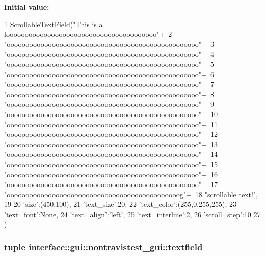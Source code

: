 {\bfseries \-Initial value\-:}
\begin{DoxyCode}
1 ScrollableTextField("This is a loooooooooooooooooooooooooooooooooooooooo\n"+\
2                       "ooooooooooooooooooooooooooooooooooooooooooooooooooo\n"+\
3                       "ooooooooooooooooooooooooooooooooooooooooooooooooooo\n"+\
4                       "ooooooooooooooooooooooooooooooooooooooooooooooooooo\n"+\
5                       "ooooooooooooooooooooooooooooooooooooooooooooooooooo\n"+\
6                       "ooooooooooooooooooooooooooooooooooooooooooooooooooo\n"+\
7                       "ooooooooooooooooooooooooooooooooooooooooooooooooooo\n"+\
8                       "ooooooooooooooooooooooooooooooooooooooooooooooooooo\n"+\
9                       "ooooooooooooooooooooooooooooooooooooooooooooooooooo\n"+\
10                       "ooooooooooooooooooooooooooooooooooooooooooooooooooo\n"+\
11                       "ooooooooooooooooooooooooooooooooooooooooooooooooooo\n"+\
12                       "ooooooooooooooooooooooooooooooooooooooooooooooooooo\n"+\
13                       "ooooooooooooooooooooooooooooooooooooooooooooooooooo\n"+\
14                       "ooooooooooooooooooooooooooooooooooooooooooooooooooo\n"+\
15                       "ooooooooooooooooooooooooooooooooooooooooooooooooooo\n"+\
16                       "ooooooooooooooooooooooooooooooooooooooooooooooooooo\n"+\
17                       "oooooooooooooooooooooooooooooooooooooooooooooog\n"+\
18                       "scrollable text!",
19                       {
20                         'size':(450,100),
21                         'text_size':20,
22                         'text_color':(255,0,255,255),
23                         'text_font':None,
24                         'text_align':'left',
25                         'text_interline':2,
26                         'scroll_step':10
27                       })
\end{DoxyCode}
\hypertarget{namespaceinterface_1_1gui_1_1nontravistest__gui_aea5180ab38ebb0c8c396aace08e88619}{
\subsubsection[{textfield}]{\setlength{\rightskip}{0pt plus 5cm}tuple interface\-::gui\-::nontravistest\-\_\-gui\-::textfield}}\label{namespaceinterface_1_1gui_1_1nontravistest__gui_aea5180ab38ebb0c8c396aace08e88619}
